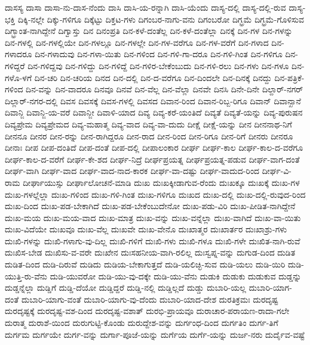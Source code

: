 {ದಾಸಸ್ಯ
ದಾಸಾ
ದಾಸಾ-ನು-ದಾಸ-ನೆಂದು
ದಾಸಿ
ದಾಸಿ-ಯ-ರನ್ನಾಗಿ
ದಾಸಿ-ಯೆಂದು
ದಾಸ್ಯ-ದಲ್ಲಿ
ದಾಸ್ಯ-ದಲ್ಲಿ-ರುವ
ದಾಸ್ಯ-ಭಕ್ತಿ
ದಿಕ್ಕಿ-ನಲ್ಲೇ
ದಿಕ್ಕು-ಗಳಿಗೂ
ದಿಕ್ಕೆಟ್ಟು
ದಿಕ್ತಟ-ಗಳು
ದಿಗಂಬರ-ನಾಗು-ವನು
ದಿಗಂಬರೋ
ದಿಗ್ಭ್ರಮೆ
ದಿಗ್ಭ್ರಮೆ-ಗೊಳಿಸುವ
ದಿಗ್ಭ್ರಾಂತ-ನಾಗಿದ್ದೇನೆ
ದಿಗ್ವಾಸ್ತು
ದಿನ
ದಿನಂಪ್ರತಿ
ದಿನ-ಕಳೆ-ದಂತೆಲ್ಲ
ದಿನ-ಕಳೆ-ದಂತೆಲ್ಲಾ
ದಿನಕ್ಕೆ
ದಿನ-ಗಳ
ದಿನ-ಗಳನ್ನು
ದಿನ-ಗಳಲ್ಲಿ
ದಿನ-ಗಳಲ್ಲಿಯೇ
ದಿನ-ಗಳಲ್ಲೂ
ದಿನ-ಗಳಲ್ಲೇ
ದಿನ-ಗಳ-ವರೆಗೂ
ದಿನ-ಗಳ-ವರೆಗೆ
ದಿನ-ಗಳಾದ
ದಿನ-ಗಳಾದರೂ
ದಿನ-ಗಳಾದುವು
ದಿನ-ಗಳಾ-ಯಿತು
ದಿನ-ಗಳಿಂದ
ದಿನ-ಗಳಿ-ಗಾ-ದರೂ
ದಿನ-ಗಳಿ-ಗಿಂತ
ದಿನ-ಗಳಿಗೂ
ದಿನ-ಗಳಿದ್ದರೆ
ದಿನ-ಗಳಿದ್ದವು
ದಿನ-ಗಳಿದ್ದು
ದಿನ-ಗಳಿದ್ದೆ
ದಿನ-ಗಳಿರ-ಬೇಕೆಂಬುದು
ದಿನ-ಗಳಿ-ರಲು
ದಿನ-ಗಳು
ದಿನ-ಗಳೂ
ದಿನ-ಗಳೊ-ಳಗೆ
ದಿನ-ಚರಿ
ದಿನ-ಚರಿಯ
ದಿನದ
ದಿನ-ದಲ್ಲಿ
ದಿನ-ದ-ವರೆಗೂ
ದಿನ-ದಿಂದಲೇ
ದಿನ-ದಿನಕ್ಕೆ
ದಿನದ್ದು
ದಿನ-ಪತ್ರಿಕೆ-ಗಳಿಂದ
ದಿನ-ವನ್ನು
ದಿನ-ವಾದರೂ
ದಿನವೂ
ದಿನವೆ
ದಿನ-ವೆಲ್ಲ
ದಿನ-ವೆಲ್ಲಾ
ದಿನವೇ
ದಿನಸಿ
ದಿನೇ-ದಿನೇ
ದಿಲ್ದಾರ್-ನಗರ್
ದಿಲ್ಲಾರ್-ನಗರ-ದಲ್ಲಿ
ದಿವಸ
ದಿವಸಕ್ಕೆ
ದಿವಸ-ಗಳಲ್ಲಿ
ದಿವಸದ
ದಿವಾನ-ರಿಂದ
ದಿವಾನ-ರಿಬ್ಬ-ರಿಗೂ
ದಿವಾನ್
ದಿವಾನ್ಖಾನೆ
ದಿವಾನ್ಜಿ
ದಿವಾನ್ಜಿ-ಯ-ವರೆ
ದಿವಾನ್ಜೀ
ದಿವಾಳಿ-ಯಾದ
ದಿವ್ಯ
ದಿವ್ಯ-ಕರೆ-ಯಂತಿದೆ
ದಿವ್ಯತೆ
ದಿವ್ಯತೆ-ಯನ್ನು
ದಿವ್ಯ-ಪುರುಷನ
ದಿವ್ಯಪ್ರೇಮ
ದಿವ್ಯಪ್ರೇಮದ
ದಿವ್ಯ-ಮಹಾತ್ಮ
ದಿವ್ಯ-ವಾದ
ದಿವ್ಯ-ವಾ-ದುದು
ದೀಕ್ಷೆ
ದೀಕ್ಷೆ-ಯನ್ನು
ದೀನ
ದೀನನಾಥ-ನಿಗೆ
ದೀನನೂ
ದೀನರ
ದೀನ-ರನ್ನು
ದೀನ-ರಾಗಿದ್ದರೂ
ದೀನ-ರಾದ
ದೀನ-ರಿಂದ
ದೀನ-ರಿಗೂ
ದೀನ-ರಿಗೆ
ದೀನರು
ದೀನರೂ
ದೀನಾಃ
ದೀಪ
ದೀಪ-ದಂತಿದೆ
ದೀಪ-ದಂತೆ
ದೀಪ-ದಲ್ಲಿ
ದೀಪಾಲಂಕಾರ
ದೀರ್ಘ
ದೀರ್ಘ-ಕಾಲ
ದೀರ್ಘ-ಕಾಲ-ದ-ವರೆಗೂ
ದೀರ್ಘ-ಕಾಲ-ದ-ವರೆಗೆ
ದೀರ್ಘ-ಕೇ-ಶದ
ದೀರ್ಘ-ನಿದ್ರೆ
ದೀರ್ಘಪ್ರಯತ್ನ
ದೀರ್ಘಪ್ರಯತ್ನ-ಪಡುವ
ದೀರ್ಘ-ವಾಗ-ದಂತೆ
ದೀರ್ಘ-ವಾಗಿ
ದೀರ್ಘ-ವಾದ
ದೀರ್ಘ-ವಾದ-ನಾದ-ಕಾರಕ
ದೀರ್ಘ-ವಾ-ದಷ್ಟು
ದೀರ್ಘ-ವಾದುದ-ರಿಂದ
ದೀರ್ಘ-ವಿ-ರಾಮ
ದೀರ್ಘಾಯುಸ್ಸು
ದೀರ್ಘಾಲೋಚನೆ-ಮಾಡಿ
ದುಃಖ
ದುಃಖಕ್ಕೀಡಾಗುವ-ರೆಂದು
ದುಃಖಕ್ಕೂ
ದುಃಖಕ್ಕೆ
ದುಃಖ-ಗಳ
ದುಃಖ-ಗಳಲ್ಲೆಲ್ಲಾ
ದುಃಖ-ಗಳಿಂದ
ದುಃಖ-ಗಳಿ-ಗಿಂತ
ದುಃಖ-ಗಳಿಗೂ
ದುಃಖದ
ದುಃಖ-ದಲ್ಲಿ
ದುಃಖ-ದಲ್ಲಿ-ರುವುದ-ರಿಂದ
ದುಃಖ-ದಿಂದ
ದುಃಖ-ಪಡ-ಬೇಕಾಗಿದೆ
ದುಃಖ-ಪಡ-ಬೇಕೆಂಬುದೇನೋ
ದುಃಖ-ಪಡು-ವಿರಿ
ದುಃಖ-ಪೀಡಿತ-ನಾಗಿದ್ದೇನೆ
ದುಃಖ-ಮಯ
ದುಃಖ-ಮಯ-ವಾದ
ದುಃಖ-ಮಾತ್ರ
ದುಃಖ-ವನ್ನು
ದುಃಖ-ವನ್ನೆಲ್ಲಾ
ದುಃಖ-ವಾಗಿದೆ
ದುಃಖ-ವಾ-ಯಿತು
ದುಃಖ-ವಿದೆಯೇ
ದುಃಖವೂ
ದುಃಖ-ವೆಲ್ಲ
ದುಃಖವೇ
ದುಃಖ-ವೇನೊ
ದುಃಖಾತ್ಮರ
ದುಃಖಾರ್ತರ
ದುಃಖಾಶ್ರು-ಗಳು
ದುಃಖಿ-ಗಳನ್ನು
ದುಃಖಿ-ಗಳಾಗು-ವು-ದಿಲ್ಲ
ದುಃಖಿ-ಗಳಿಗೆ
ದುಃಖಿ-ಗಳು
ದುಃಖಿ-ಗಳೂ
ದುಃಖಿ-ಗಳೇ
ದುಃಖಿತ-ನಾಗಿ-ರುವೆ
ದುಃಖಿಸ-ಬೇಡ
ದುಃಖಿಸು-ವ-ವರೇ
ದುಃಖೇನ
ದುಃಸಹನೀಯ-ವಾಗಿ-ರಲಿಲ್ಲ
ದುಃಸ್ವಪ್ನ-ವನ್ನು
ದುಗುಡ-ದಿಂದ
ದುಡಿತ
ದುಡಿತ-ದಿಂದ
ದುಡಿ-ದಿರುವೆ
ದುಡಿದು
ದುಡಿಯ-ಬೇಕಾಗುತ್ತದೆ
ದುಡಿ-ಯಲಿಚ್ಛಿ-ಸುವ
ದುಡಿ-ಯಲು
ದುಡಿ-ಯಿರಿ
ದುಡಿ-ಯುತ್ತಿ-ರು-ವೆನು
ದುಡಿ-ಯುವರೋ
ದುಡಿ-ಯು-ವು-ದಕ್ಕೇ
ದುಡಿ-ಯು-ವೆನು
ದುಡುಕಿ
ದುಡುಕು
ದುಡುಕುವ
ದುಡ್ಡನ್ನು
ದುಡ್ಡನ್ನೆಲ್ಲಾ
ದುಡ್ಡಿಗೆ
ದುಡ್ಡಿ-ದೆಯೋ
ದುಡ್ಡಿದ್ದರೆ
ದುಡ್ಡಿ-ನಲ್ಲಿ
ದುಡ್ಡಿಲ್ಲದೆ
ದುಡ್ಡು
ದುಬಾರಿ-ಯಲ್ಲ
ದುಬಾರಿ-ಯಾಗ-ದಂತೆ
ದುಬಾರಿ-ಯಾಗು-ವಂತೆ
ದುಬಾರಿ-ಯಾಗು-ವು-ದೆಂದು
ದುಬಾರಿ-ಯಾದ-ದೇಶ
ದುರತಿಕ್ರಮಃ
ದುರದೃಷ್ಟ
ದುರದೃಷ್ಟಕ್ಕೆ
ದುರದೃಷ್ಟ-ವಶ-ದಿಂದ
ದುರದೃಷ್ಟ-ವಶಾತ್
ದುರಭಿ-ಪ್ರಾಯವೂ
ದುರಾಚಾರ-ಪರಾಯಣ-ರಾದಾ-ಗಲೇ
ದುರಾತ್ಮ
ದುರಾಶೆ-ಯಿಂದ
ದುರುಗುಟ್ಟಿ-ಕೊಂಡು
ದುರುದ್ದೇಶ-ವನ್ನು
ದುರ್ಗಂಧ-ದಿಂದ
ದುರ್ಗತಿಂ
ದುರ್ಗ-ತಿಗೆ
ದುರ್ಗಮ
ದುರ್ಗಯೇ
ದುರ್ಗ-ವನ್ನು
ದುರ್ಗಾ-ಪೂಜೆ-ಯನ್ನು
ದುರ್ಗೆಯ
ದುರ್ಗೆ-ಯನ್ನು
ದುರ್ಜ-ನರು
ದುರ್ದೈವ-ವಷ್ಟೆ
}

